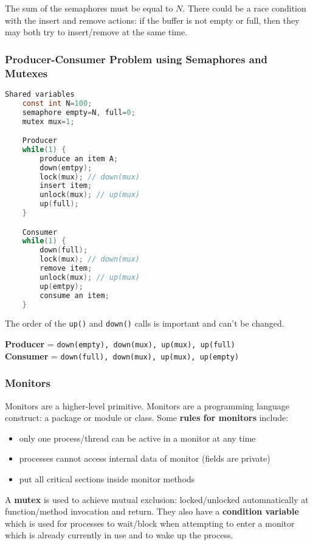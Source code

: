 \documentclass{article}
\newcommand{\bold}[1]{\textbf{#1}}
\renewcommand{\b}{\item[$\circ$]}
\newcommand{\newlist}{\begin{itemize}}
\renewcommand{\endlist}{\end{itemize}}
\begin{document}
    \noindent The sum of the semaphores must be equal to $N$. There could be a race condition with the insert and remove actions: if the buffer is not empty or full, then they may both try to insert/remove at the same time. \\
    
    \subsubsection{Producer-Consumer Problem using Semaphores and Mutexes}

    \begin{lstlisting}[language=C]
    Shared variables
    const int N=100;
    semaphore empty=N, full=0;
    mutex mux=1;

    Producer
    while(1) {
        produce an item A; 
        down(emtpy);
        lock(mux); // down(mux)
        insert item;
        unlock(mux); // up(mux)
        up(full);
    }

    Consumer 
    while(1) {
        down(full);
        lock(mux); // down(mux)
        remove item;
        unlock(mux); // up(mux)
        up(emtpy);
        consume an item;
    }
    \end{lstlisting}

    The order of the \texttt{up()} and \texttt{down()} calls is important and can't be changed. 

    \begin{center}
        \bold{Producer} = \texttt{down(empty), down(mux), up(mux), up(full)} \\ 
        \bold{Consumer} = \texttt{down(full), down(mux), up(mux), up(empty)}
    \end{center}

    \subsubsection{Monitors}

    Monitors are a higher-level primitive. Monitors are a programming language construct: a package or module or class. Some \bold{rules for monitors} include:

    \newlist
    \b only one process/thread can be active in a monitor at any time
    \b processes cannot access internal data of monitor (fields are private)
    \b put all critical sections inside monitor methods
    \endlist

    \noindent A \bold{mutex} is used to achieve mutual exclusion: locked/unlocked automnatically at function/method invocation and return. They also have a \bold{condition variable} which is used for processes to wait/block when attempting to enter a monitor which is already currently in use and to wake up the process. \\
\end{document}
